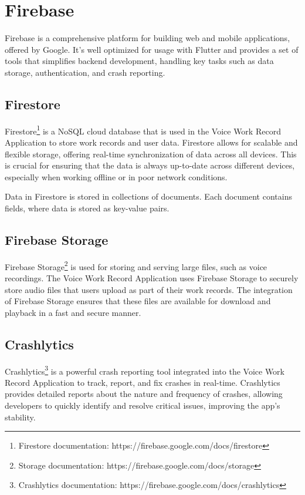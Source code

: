 \documentclass[
  digital,     %
  oneside,     %
  nosansbold,  %
  nocolorbold, %
  lof,         %
  lot,         %
]{fithesis4}
\begin{document}
\section{Firebase}

Firebase is a comprehensive platform for building web and mobile applications, offered by Google. It's well optimized for usage with Flutter and provides a set of tools that simplifies backend development, handling key tasks such as data storage, authentication, and crash reporting.

\subsection{Firestore}

Firestore\footnote{Firestore documentation: https://firebase.google.com/docs/firestore} is a \gls{NoSQL} cloud database that is used in the Voice Work Record Application to store work records and user data. Firestore allows for scalable and flexible storage, offering real-time synchronization of data across all devices. This is crucial for ensuring that the data is always up-to-date across different devices, especially when working offline or in poor network conditions.

Data in Firestore is stored in collections of documents. Each document contains fields, where data is stored as key-value pairs.

\subsection{Firebase Storage}

Firebase Storage\footnote{Storage documentation: https://firebase.google.com/docs/storage} is used for storing and serving large files, such as voice recordings. The Voice Work Record Application uses Firebase Storage to securely store audio files that users upload as part of their work records. The integration of Firebase Storage ensures that these files are available for download and playback in a fast and secure manner.

\subsection{Crashlytics}

Crashlytics\footnote{Crashlytics documentation: https://firebase.google.com/docs/crashlytics} is a powerful crash reporting tool integrated into the Voice Work Record Application to track, report, and fix crashes in real-time. Crashlytics provides detailed reports about the nature and frequency of crashes, allowing developers to quickly identify and resolve critical issues, improving the app's stability.
\end{document}
